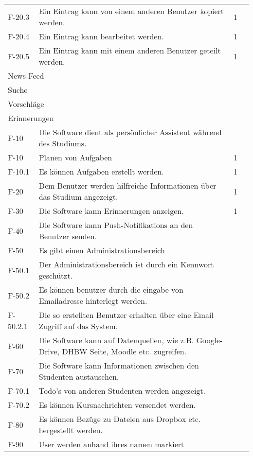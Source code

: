 \begin{tabularx}{\textwidth}{|l|X|l|l|}
    F-20.3 & Ein Eintrag kann von einem anderen Benutzer kopiert werden. & 1 & \\
    F-20.4 & Ein Eintrag kann bearbeitet werden. & 1 & \\
    F-20.5 & Ein Eintrag kann mit einem anderen Benutzer geteilt werden. & 1 & \\
    \hline
    \multicolumn{4}{|l|}{News-Feed}\\
    \hline
    \multicolumn{4}{|l|}{Suche}\\
    \hline
    \multicolumn{4}{|l|}{Vorschläge}\\
    \hline
    \multicolumn{4}{|l|}{Erinnerungen}\\
    \hline

    F-10 & Die Software dient als persönlicher Assistent während des Studiums. & & \\
    F-10 & Planen von Aufgaben & 1 & \\
    F-10.1 & Es können Aufgaben erstellt werden. & 1 & \\

    F-20 & Dem Benutzer werden hilfreiche Informationen über das Studium angezeigt. & 1 & \\

    F-30 & Die Software kann Erinnerungen anzeigen. & 1 & \\

    F-40 & Die Software kann Push-Notifikations an den Benutzer senden. & & \\

    F-50 & Es gibt einen Administrationsbereich & & \\
    F-50.1 & Der Administrationsbereich ist durch ein Kennwort geschützt. & & \\ %
    F-50.2 & Es können benutzer durch die eingabe von Emailadresse hinterlegt werden. & & \\
    F-50.2.1 & Die so erstellten Benutzer erhalten über eine Email Zugriff auf das System. & & \\ %
    
    F-60 & Die Software kann auf Datenquellen, wie z.B. Google-Drive, DHBW Seite, Moodle etc. zugreifen. & & \\

    F-70 & Die Software kann Informationen zwischen den Studenten austauschen. & & \\
    F-70.1 & Todo's von anderen Studenten werden angezeigt. & &\\
    F-70.2 & Es können Kursnachrichten versendet werden. & &\\
    F-80 & Es können Bezüge zu Dateien aus Dropbox etc. hergestellt werden. & &\\
    F-90 & User werden anhand ihres namen markiert & &\\ %


\end{tabularx}
